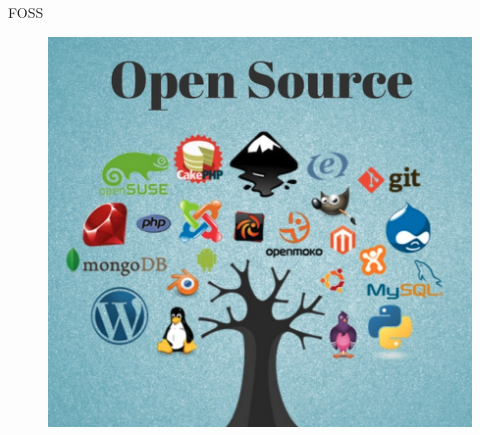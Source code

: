 \documentclass{beamer}
\begin{document}
\begin{frame}[allowframebreaks]{FOSS}
            \begin{figure}
                \includegraphics[scale=0.25]{figs/fossexamples.png}
            \end{figure}

        \end{frame}
\end{document}
